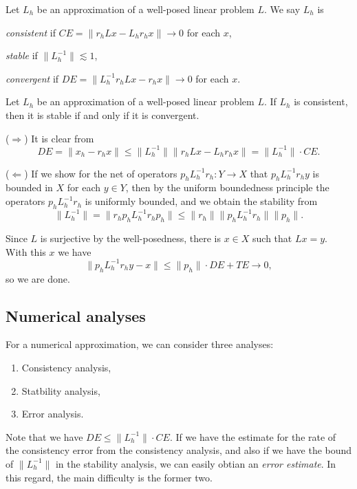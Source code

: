 \documentclass[a4paper]{article}
\begin{document}
\begin{defn}
Let $L_h$ be an approximation of a well-posed linear problem $L$.
We say $L_h$ is
\begin{parts}
\item \emph{consistent} if $CE=\|r_hLx-L_hr_hx\|\to0$ for each $x$,
\item \emph{stable} if $\|L_h^{-1}\|\lesssim1$,
\item \emph{convergent} if $DE=\|L_h^{-1}r_hLx-r_hx\|\to0$ for each $x$.
\end{parts}
\end{defn}

\begin{thm}
Let $L_h$ be an approximation of a well-posed linear problem $L$.
If $L_h$ is consistent, then it is stable if and only if it is convergent.
\end{thm}
\begin{pf}
($\Rightarrow$)
It is clear from
\[DE=\|x_h-r_hx\|\le\|L_h^{-1}\|\|r_hLx-L_hr_hx\|=\|L_h^{-1}\|\cdot CE.\]

($\Leftarrow$)
If we show for the net of operators $p_hL_h^{-1}r_h:Y\to X$ that $p_hL_h^{-1}r_hy$ is bounded in $X$ for each $y\in Y$, then by the uniform boundedness principle the operators $p_hL_h^{-1}r_h$ is uniformly bounded, and we obtain the stability from
\[\|L_h^{-1}\|=\|r_hp_hL_h^{-1}r_hp_h\|\le\|r_h\|\|p_hL_h^{-1}r_h\|\|p_h\|.\]

Since $L$ is surjective by the well-posedness, there is $x\in X$ such that $Lx=y$.
With this $x$ we have
\[\|p_hL_h^{-1}r_hy-x\|\le\|p_h\|\cdot DE+TE\to0,\]
so we are done. 

\end{pf}




\subsection{Numerical analyses}
For a numerical approximation, we can consider three analyses:
\begin{enumerate}
	\item Consistency analysis,
	\item Statbility analysis,
	\item Error analysis.
\end{enumerate}
Note that we have $DE\le\|L_h^{-1}\|\cdot CE$.
If we have the estimate for the rate of the consistency error from the consistency analysis, and also if we have the bound of $\|L_h^{-1}\|$ in the stability analysis, we can easily obtian an \emph{error estimate}.
In this regard, the main difficulty is the former two.
\end{document}
